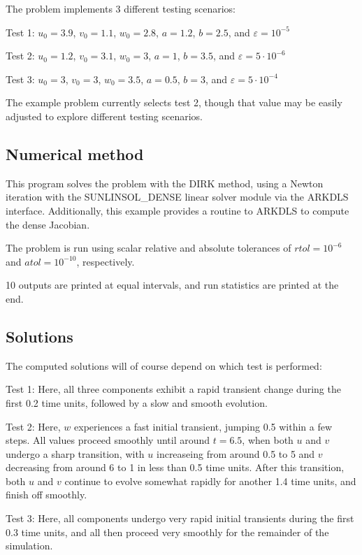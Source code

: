 \documentclass[letterpaper,10pt,english]{sphinxmanual}
\begin{document}
The problem implements 3 different testing scenarios:

Test 1:  \(u_0=3.9\),  \(v_0=1.1\),  \(w_0=2.8\),
\(a=1.2\), \(b=2.5\), and \(\varepsilon=10^{-5}\)

Test 2:  \(u_0=1.2\), \(v_0=3.1\), \(w_0=3\), \(a=1\),
\(b=3.5\), and \(\varepsilon=5\cdot10^{-6}\)

Test 3:  \(u_0=3\), \(v_0=3\), \(w_0=3.5\), \(a=0.5\),
\(b=3\), and \(\varepsilon=5\cdot10^{-4}\)

The example problem currently selects test 2, though that value may be
easily adjusted to explore different testing scenarios.


\subsection{Numerical method}
\label{c_serial:id6}
This program solves the problem with the DIRK method, using a
Newton iteration with the SUNLINSOL\_DENSE linear solver module via
the ARKDLS interface.  Additionally, this example provides a routine
to ARKDLS to compute the dense Jacobian.

The problem is run using scalar relative and absolute tolerances of
\(rtol=10^{-6}\) and \(atol=10^{-10}\), respectively.

10 outputs are printed at equal intervals, and run statistics
are printed at the end.


\subsection{Solutions}
\label{c_serial:id7}
The computed solutions will of course depend on which test is
performed:

Test 1:  Here, all three components exhibit a rapid transient change
during the first 0.2 time units, followed by a slow and smooth
evolution.

Test 2: Here, \(w\) experiences a fast initial transient, jumping
0.5 within a few steps.  All values proceed smoothly until around
\(t=6.5\), when both \(u\) and \(v\) undergo a sharp
transition, with \(u\) increaseing from around 0.5 to 5 and
\(v\) decreasing from around 6 to 1 in less than 0.5 time units.
After this transition, both \(u\) and \(v\) continue to evolve
somewhat rapidly for another 1.4 time units, and finish off smoothly.

Test 3: Here, all components undergo very rapid initial transients
during the first 0.3 time units, and all then proceed very smoothly
for the remainder of the simulation.
\end{document}
